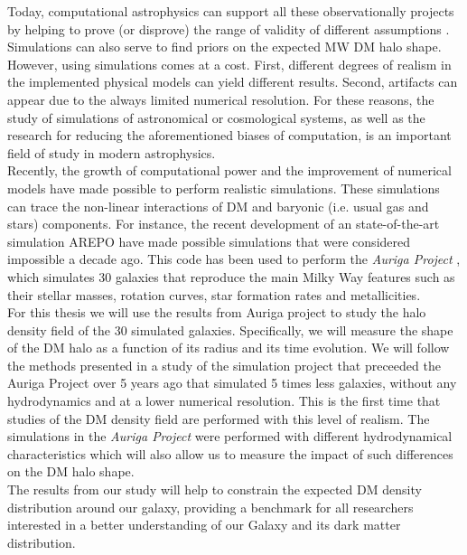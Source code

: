 Today, computational astrophysics can support all these observationally projects by helping to prove (or disprove) the range of validity of different assumptions \cite{prove,bardeen,Vera-Ciro2011}.
Simulations can also serve to find priors on the expected MW DM halo shape.
However, using simulations comes at a cost.
First, different degrees of realism in the implemented physical models can yield different results.
Second, artifacts can appear due to the always limited numerical resolution. 
For these reasons, the study of simulations of astronomical or cosmological systems, as well as the research for reducing the aforementioned biases of computation, is an important field of study in modern astrophysics.\\

Recently, the growth of computational power and the improvement of numerical models have made possible to perform realistic simulations.
These simulations can trace the non-linear interactions of DM and baryonic (i.e. usual gas and stars) components. 
For instance, the recent development of an state-of-the-art simulation AREPO \cite{arepo} have made possible simulations that were considered impossible a decade ago.
This code has been used to perform the \emph{Auriga Project} \cite{auriga}, which simulates 30 galaxies that reproduce the main Milky Way features such as their stellar masses, rotation curves, star formation rates and metallicities.\\

For this thesis we will use the results from Auriga project \cite{auriga} to study the halo density field of the 30 simulated galaxies.
Specifically, we will measure the shape of the DM halo as a function of its radius and its time evolution.
We will follow the methods presented in a study of the simulation project that preceeded the Auriga Project over 5 years ago \cite{Vera-Ciro2011} that simulated 5 times less galaxies, without any hydrodynamics and at a lower numerical resolution. 
This is the first time that studies of the DM density field are performed with this level of realism.
The simulations in the \emph{Auriga Project} were performed with different hydrodynamical characteristics 
which will also allow us to measure the impact of such differences on the DM halo shape.\\

The results from our study will help to constrain the expected DM density distribution around our galaxy, 
providing a benchmark for all researchers interested in a better understanding of our Galaxy and its 
dark matter distribution.

